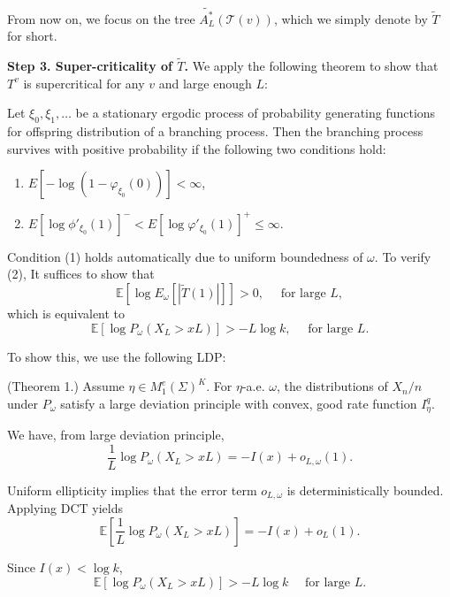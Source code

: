 From now on, we focus on the tree $\widetilde{A^*_L}(\mathcal{T}(v))$, which we simply denote by $\tilde T$ for short.

\textbf{Step 3. Super-criticality of $\tilde T$.} We apply the following theorem to show that $T^v$ is supercritical for any $v$ and large enough $L$:

\begin{theorem}
	\label{thm:AthreyaKarlthm}
	Let $\xi_0, \xi_1, \ldots$ be a stationary ergodic process of probability generating functions for offspring distribution of a branching process. Then the branching process survives with positive probability if the following two conditions hold:
	\begin{enumerate}
		\item $E \left[ - \log \left( 1 - \varphi_{\xi_0}(0) \right)  \right] < \infty $,
		\item $E \left[ \log \phi'_{\xi_0}(1) \right] ^- < E \left[ \log \varphi'_{\xi_0}(1) \right] ^+ \le \infty $.
	\end{enumerate}
\end{theorem}

Condition (1) holds automatically due to uniform boundedness of $\omega$. To verify (2),
It suffices to show that
\[
	\mathbb{E}\left[ \log E_\omega\left[ |\tilde T(1)| \right]  \right] > 0, \quad \text{ for large }L
,\] 
which is equivalent to
\[
	\mathbb{E}\left[ \log P_\omega(X_L > xL) \right] > - L \log k, \quad \text{ for large }L
.\] 

To show this, we use the following LDP:
\begin{theorem}
	\label{thm:PositionLDPERWREComets}
	(Theorem 1.) Assume $\eta \in M_1^e(\Sigma)^K$. For $\eta$-a.e. $\omega$, the distributions of $X_n / n$ under $P_\omega$ satisfy a large deviation principle with convex, good rate function $I_\eta^q$.
\end{theorem}

We have, from large deviation principle,
\[
	\frac{1}{L} \log P_\omega(X_L > x L) = - I(x) + o_{L, \omega}(1)
.\] 

Uniform ellipticity implies that the error term $o_{L, \omega}$ is deterministically bounded. Applying DCT yields
\[
	\mathbb{E}\left[\frac{1}{L} \log P_\omega(X_L > x L)\right] = - I(x) + o_{L}(1)
.\]

Since $I(x) < \log k$,
\[
	\mathbb{E}\left[\log P_\omega(X_L > x L)\right] > - L \log k \quad \text{ for large }L
.\] 

